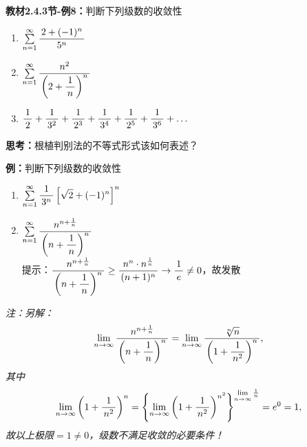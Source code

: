 {\bf 教材2.4.3节-例8：}判断下列级数的收敛性
\begin{enumerate} [(1)]
  \setlength{\itemindent}{1cm}
  \item $\sumn\df{2+(-1)^n}{5^n}$
  \item $\sumn\df{n^2}{\left(2+\df 1n\right)^n}$
  \item $\df 12+\df 1{3^2}+\df 1{2^3}+\df 1{3^4}+\df 1{2^5}+\df 1{3^6}+\ldots$
\end{enumerate}


{\bf 思考：}根植判别法的不等式形式该如何表述？

{\bf 例：}判断下列级数的收敛性
\begin{enumerate} [(1)]
  \setlength{\itemindent}{1cm}
  \item $\sumn\df1{3^n}\left[\sqrt2+(-1)^n\right]^n$
  \item $\sumn\df{n^{n+\frac1n}}{\left(n+\df1n\right)^n}$\\
  提示：$\df{n^{n+\frac1n}}{\left(n+\df1n\right)^n}\geq\df{n^n\cdot
  n^{\frac1n}}{(n+1)^n}\to\df1e\ne0$，故发散
\end{enumerate}

{\it 注：另解：
$$\limn\df{n^{n+\frac1n}}{\left(n+\df1n\right)^n}
=\limn\df{\sqrt[n]n}{\left(1+\df1{n^2}\right)^n},$$
其中
$$\limn\left(1+\df1{n^2}\right)^n=
\left\{\limn\left(1+\df1{n^2}\right)^{n^2}\right\}^{\limn\frac1n}=e^0=1,$$
故以上极限$=1\ne0$，级数不满足收敛的必要条件！
}

